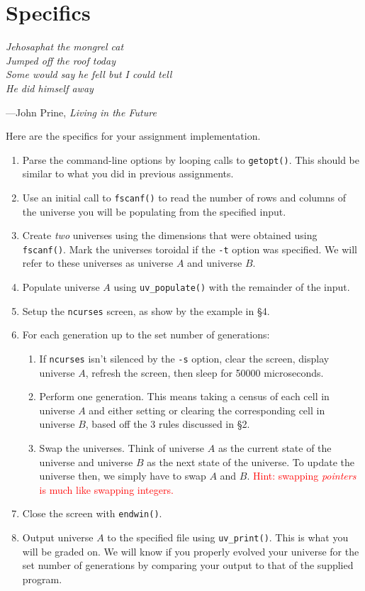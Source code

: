 \section{Specifics}

\textwidth
\epigraph{\emph{Jehosaphat the mongrel cat \\ Jumped off the roof today \\ Some
would say he fell but I could tell \\ He did himself away}}{---John Prine,
\emph{Living in the Future}}

Here are the specifics for your assignment implementation.

\begin{enumerate}
  \item Parse the command-line options by looping calls to \texttt{getopt()}.
    This should be similar to what you did in previous assignments.
  \item Use an initial call to \texttt{fscanf()} to read the number of rows and columns of
    the universe you will be populating from the specified input.
  \item Create \emph{two} universes using the dimensions that were obtained using \texttt{fscanf()}. Mark
    the universes toroidal if the \texttt{-t} option was specified. We will
    refer to these universes as universe $A$ and universe $B$.
  \item Populate universe $A$ using \texttt{uv\_populate()} with the remainder of the
    input.
  \item Setup the \texttt{ncurses} screen, as show by the example in \S 4.
  \item For each generation up to the set number of generations:
    \begin{enumerate}
      \item If \texttt{ncurses} isn't silenced by the \texttt{-s} option, clear
        the screen, display universe $A$, refresh the screen, then sleep for 50000
        microseconds.
      \item Perform one generation. This means taking a census of each cell in
        universe $A$ and either setting or clearing the corresponding cell in
        universe $B$, based off the 3 rules discussed in \S 2.
      \item Swap the universes. Think of universe $A$ as the current state of the
        universe and universe $B$ as the next state of the universe. To update the
        universe then, we simply have to swap $A$ and $B$. \textcolor{red}{Hint:
        swapping \emph{pointers} is much like swapping integers.}
    \end{enumerate}
  \item Close the screen with \texttt{endwin()}.
  \item Output universe $A$ to the specified file using \texttt{uv\_print()}.
    This is what you will be graded on. We will know if you properly
    evolved your universe for the set number of generations by comparing your output
    to that of the supplied program.
\end{enumerate}
